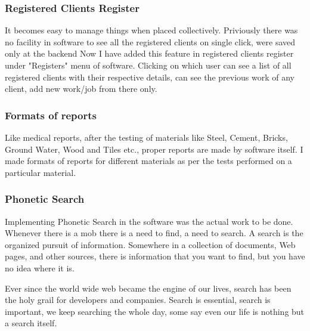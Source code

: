 
\subsubsection{Registered Clients Register}
It becomes easy to manage things when placed collectively. 
Priviously there was no facility in software to see all the registered 
clients  on single click, were saved only at the backend Now I have added 
this feature in registered clients register under "Registers" menu of software. 
Clicking on which user can see a list of all registered clients with their 
respective details, can see the previous work of any client, add new work/job from 
there only.
\subsubsection{Formats of reports}
Like medical reports, after the testing of materials like Steel, Cement, Bricks,
Ground Water, Wood and Tiles etc., proper reports are made by software itself.
I made formats of reports for different materials as per the tests performed 
on a particular material.
\subsubsection{Phonetic Search}
Implementing Phonetic Search in the software was the actual work to be done.
Whenever there is a mob there is a need to find, a need to search. 
A search is the organized pursuit of information. Somewhere in a collection
of documents, Web pages, and other sources, there is information that you want
to find, but you have no idea where it is. 

Ever since the world wide web became the engine of our lives, search has been 
the holy grail for developers and companies. Search is essential, search is 
important, we keep searching the whole day, some say even our life is nothing
but a search itself. 

